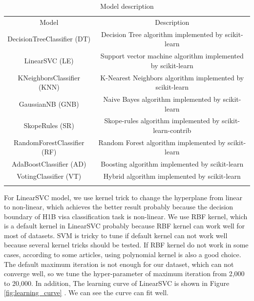 \begin{table}[h]
\caption{Model description}
\label{tab:model}       %
\begin{tabular}{cc}
\hline\noalign{\smallskip}
Model & Description \\
\noalign{\smallskip}\hline\noalign{\smallskip}
DecisionTreeClassifier (DT) & Decision Tree algorithm\citep{Breiman} implemented by scikit-learn\\
LinearSVC (LE) & Support vector machine algorithm\citep{Yuan} implemented by scikit-learn\\
KNeighborsClassifier (KNN) & K-Nearest Neighbors algorithm\citep{Coomans} implemented by scikit-learn\\
GaussianNB (GNB) & Naive Bayes algorithm\citep{McCallum} implemented by scikit-learn\\
SkopeRules (SR) & Skope-rules algorithm implemented by scikit-learn-contrib\\
RandomForestClassifier (RF) & Random Forest algorithm\citep{Kam} implemented by scikit-learn\\
AdaBoostClassifier (AD) & Boosting algorithm\citep{Schapire} implemented by scikit-learn\\
VotingClassifier (VT) & Hybrid algorithm implemented by scikit-learn\\
\noalign{\smallskip}\hline
\end{tabular}
\end{table}

For LinearSVC model, we use kernel trick to change the hyperplane from linear to non-linear, which achieves the better result probably because the decision boundary of H1B visa classification task is non-linear. We use RBF kernel, which is a default kernel in LinearSVC probably because RBF kernel can work well for most of datasets.  SVM is tricky to tune if default kernel can not work well because several kernel tricks should be tested. If RBF kernel do not work in some cases, according to some articles, using polynomial kernel is also a good choice. The default maximum iteration is not enough for our dataset, which can not converge well, so we tune the hyper-parameter of maximum iteration from 2,000 to 20,000. In addition, The learning curve of LinearSVC is shown in Figure \ref{fig:learning_curve} . We can see the curve can fit well. 

